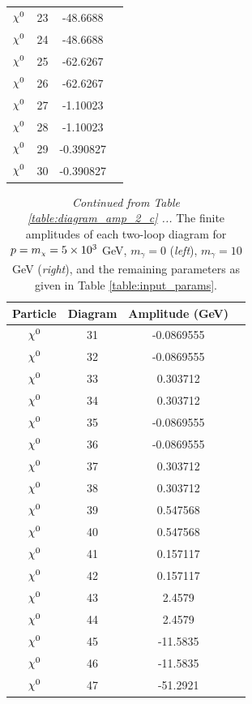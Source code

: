 \documentclass[11pt]{article}
\newcommand{\mychi}{\raisebox{0pt}[1ex][1ex]{\tiny$\chi$}}
\newcommand{\mychibig}{\raisebox{0pt}[1ex][1ex]{$\chi$}}
\def\mc{m_{\mychi}}
\begin{document}
\begin{table}[h!]
\begin{tabular}{c c c c}
$\mychibig^0$ & 23 & -48.6688 \\ 
$\mychibig^0$ & 24 & -48.6688 \\ 
$\mychibig^0$ & 25 & -62.6267 \\ 
$\mychibig^0$ & 26 & -62.6267 \\ 
$\mychibig^0$ & 27 & -1.10023 \\ 
$\mychibig^0$ & 28 & -1.10023 \\ 
$\mychibig^0$ & 29 & -0.390827 \\ 
$\mychibig^0$ & 30 & -0.390827 \\ 
\hline\end{tabular}
\end{table}

\begin{table}[h!]
\caption{\textit{Continued from Table \ref{table:diagram_amp_2_c} ... } The finite amplitudes of each two-loop diagram for $p=\mc=5\times10^3$ GeV, $m_{\gamma}=0$ (\textit{left}), $m_{\gamma}=10$ GeV (\textit{right}), and the remaining parameters as given in Table \ref{table:input_params}.}\label{table:diagram_amp_2_d}
\centering
\vspace{0.2cm}
\begin{tabular}{c c c c}
Particle & Diagram & Amplitude (GeV) \\
\hline
$\mychibig^0$ & 31 & -0.0869555 \\ 
$\mychibig^0$ & 32 & -0.0869555 \\ 
$\mychibig^0$ & 33 & 0.303712 \\ 
$\mychibig^0$ & 34 & 0.303712 \\ 
$\mychibig^0$ & 35 & -0.0869555 \\ 
$\mychibig^0$ & 36 & -0.0869555 \\ 
$\mychibig^0$ & 37 & 0.303712 \\ 
$\mychibig^0$ & 38 & 0.303712 \\ 
$\mychibig^0$ & 39 & 0.547568 \\ 
$\mychibig^0$ & 40 & 0.547568 \\ 
$\mychibig^0$ & 41 & 0.157117 \\ 
$\mychibig^0$ & 42 & 0.157117 \\ 
$\mychibig^0$ & 43 & 2.4579 \\ 
$\mychibig^0$ & 44 & 2.4579 \\ 
$\mychibig^0$ & 45 & -11.5835 \\ 
$\mychibig^0$ & 46 & -11.5835 \\ 
$\mychibig^0$ & 47 & -51.2921 \\ 

\end{tabular}
\end{table}
\end{document}
